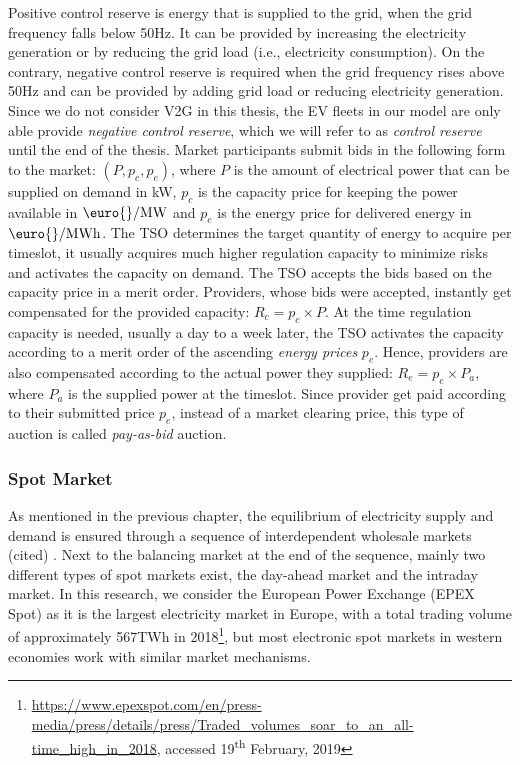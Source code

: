 \documentclass[a4paper, 12pt]{article}
\let\cite\shortcite
\begin{document}
Positive control reserve is energy that is supplied to the grid, when the grid
frequency falls below 50Hz. It can be provided by increasing the electricity
generation or by reducing the grid load (i.e., electricity consumption). On the
contrary, negative control reserve is required when the grid frequency rises
above 50Hz and can be provided by adding grid load or reducing electricity
generation. Since we do not consider V2G in this thesis, the EV fleets in our
model are only able provide \emph{negative control reserve}, which we will refer to
as \emph{control reserve} until the end of the thesis. Market participants submit
bids in the following form to the market: \((P, p_c, p_e)\), where \(P\) is the
amount of electrical power that can be supplied on demand in kW, \(p_c\) is the
capacity price for keeping the power available in \(\text{\euro{}/MW}\) and \(p_e\)
is the energy price for delivered energy in \(\text{\euro{}/MWh}\). The TSO
determines the target quantity of energy to acquire per timeslot, it usually
acquires much higher regulation capacity to minimize risks and activates the
capacity on demand. The TSO accepts the bids based on the capacity price in a
merit order. Providers, whose bids were accepted, instantly get compensated for
the provided capacity: \(R_c = p_c \times P\). At the time regulation capacity is
needed, usually a day to a week later, the TSO activates the capacity according
to a merit order of the ascending \emph{energy prices} \(p_e\). Hence, providers are
also compensated according to the actual power they supplied: \(R_e = p_e \times
P_a\), where \(P_a\) is the supplied power at the timeslot. Since provider get paid
according to their submitted price \(p_e\), instead of a market clearing price,
this type of auction is called \emph{pay-as-bid} auction.
\subsubsection{Spot Market}
\label{sec:org0ec15e2}
As mentioned in the previous chapter, the equilibrium of electricity supply and
demand is ensured through a sequence of interdependent wholesale markets (cited)
\cite{pape16_are_fundam_enoug}. Next to the balancing market at the end of the
sequence, mainly two different types of spot markets exist, the day-ahead
market and the intraday market. In this research, we consider the European Power
Exchange (EPEX Spot) as it is the largest electricity market in Europe, with a
total trading volume of approximately 567TWh in 2018\footnote{\url{https://www.epexspot.com/en/press-media/press/details/press/Traded\_volumes\_soar\_to\_an\_all-time\_high\_in\_2018},
accessed 19\textsuperscript{th} February, 2019\label{orgde1106a}}, but most electronic
spot markets in western economies work with similar market mechanisms.
\end{document}
